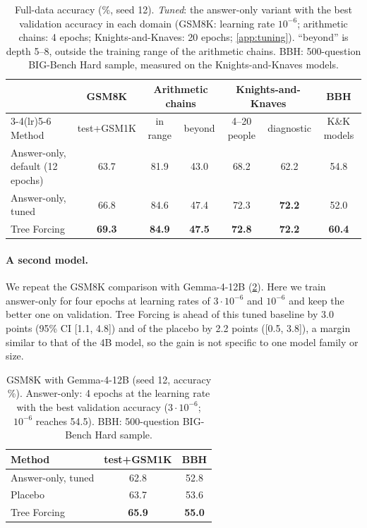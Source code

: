 \documentclass{article}
\newcommand{\tf}{Tree Forcing}
\begin{document}
\begin{table}[t]
\centering
\footnotesize
\caption{Full-data accuracy (\%, seed 12). \emph{Tuned}: the answer-only variant with the best validation accuracy in
each domain (GSM8K: learning rate $10^{-6}$; arithmetic chains: 4 epochs; Knights-and-Knaves: 20 epochs;
\cref{app:tuning}). ``beyond'' is depth 5--8, outside the training range of the arithmetic chains. BBH: 500-question
BIG-Bench Hard sample, measured on the Knights-and-Knaves models.}
\label{tab:main}
\begin{tabular}{lcccccc}
\toprule
& GSM8K & \multicolumn{2}{c}{Arithmetic chains} & \multicolumn{2}{c}{Knights-and-Knaves} & BBH \\
\cmidrule(lr){3-4}\cmidrule(lr){5-6}
Method & test+GSM1K & in range & beyond & 4--20 people & diagnostic & K\&K models \\
\midrule
Answer-only, default (12 epochs) & 63.7 & 81.9 & 43.0 & 68.2 & 62.2 & 54.8 \\
Answer-only, tuned & 66.8 & 84.6 & 47.4 & 72.3 & \textbf{72.2} & 52.0 \\
\tf{} & \textbf{69.3} & \textbf{84.9} & \textbf{47.5} & \textbf{72.8} & \textbf{72.2} & \textbf{60.4} \\
\bottomrule
\end{tabular}
\end{table}

\paragraph{A second model.} We repeat the GSM8K comparison with Gemma-4-12B (\cref{tab:gemma}). Here we train
answer-only for four epochs at learning rates of $3\cdot10^{-6}$ and $10^{-6}$ and keep the better one on validation.
\tf{} is ahead of this tuned baseline by 3.0 points (95\% CI [1.1, 4.8]) and of the placebo by 2.2 points
([0.5, 3.8]), a margin similar to that of the 4B model, so the gain is not specific to one model family or size.

\begin{table}[t]
\centering
\small
\caption{GSM8K with Gemma-4-12B (seed 12, accuracy \%). Answer-only: 4 epochs at the learning rate with the best
validation accuracy ($3\cdot10^{-6}$; $10^{-6}$ reaches 54.5). BBH: 500-question BIG-Bench Hard sample.}
\label{tab:gemma}
\begin{tabular}{lcc}
\toprule
Method & test+GSM1K & BBH \\
\midrule
Answer-only, tuned & 62.8 & 52.8 \\
Placebo & 63.7 & 53.6 \\
\tf{} & \textbf{65.9} & \textbf{55.0} \\
\bottomrule
\end{tabular}
\end{table}
\end{document}
